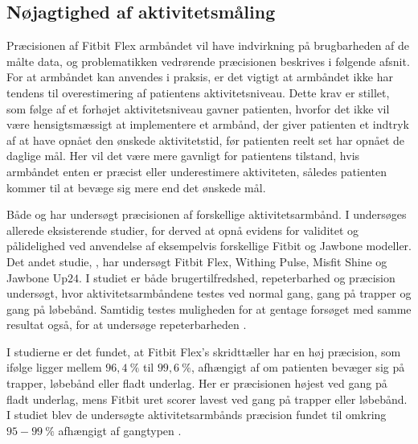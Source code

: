 \subsection{Nøjagtighed af aktivitetsmåling}

Præcisionen af Fitbit Flex armbåndet vil have indvirkning på brugbarheden af de målte data, og problematikken vedrørende præcisionen beskrives i følgende afsnit. For at armbåndet kan anvendes i praksis, er det vigtigt at armbåndet ikke har tendens til overestimering af patientens aktivitetsniveau. Dette krav er stillet, som følge af et forhøjet aktivitetsniveau gavner patienten, hvorfor det ikke vil være hensigtsmæssigt at implementere et armbånd, der giver patienten et indtryk af at have opnået den ønskede aktivitetstid, før patienten reelt set har opnået de daglige mål. Her vil det være mere gavnligt for patientens tilstand, hvis armbåndet enten er præcist eller underestimere aktiviteten, således patienten kommer til at bevæge sig mere end det ønskede mål.

Både  og  har undersøgt præcisionen af forskellige aktivitetsarmbånd. I  undersøges allerede eksisterende studier, for derved at opnå evidens for validitet og pålidelighed ved anvendelse af eksempelvis forskellige Fitbit og Jawbone modeller. Det andet studie, , har undersøgt Fitbit Flex, Withing Pulse, Misfit Shine og Jawbone Up$24$. I studiet er både brugertilfredshed, repeterbarhed og præcision undersøgt, hvor aktivitetsarmbåndene testes ved normal gang, gang på trapper og gang på løbebånd. Samtidig testes muligheden for at gentage forsøget med samme resultat også, for at undersøge repeterbarheden \citep{evenson2015, kaewkannate2016}.

I studierne er det fundet, at Fitbit Flex's skridttæller har en høj præcision, som ifølge  ligger mellem $96,4~\%$ til $99,6~\%$, afhængigt af om patienten bevæger sig på trapper, løbebånd eller fladt underlag. Her er præcisionen højest ved gang på fladt underlag, mens Fitbit uret scorer lavest ved gang på trapper eller løbebånd. I studiet blev de undersøgte aktivitetsarmbånds præcision fundet til omkring $95-99~\%$ afhængigt af gangtypen \citep{kaewkannate2016}.

